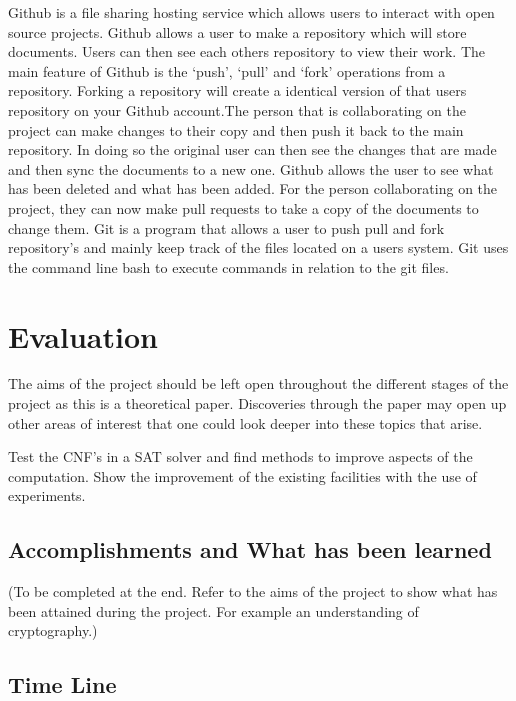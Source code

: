 \documentclass[11pt,a4paper, notitlepage]{report}
\begin{document}
Github is a file sharing hosting service which allows users to interact with open source projects. Github allows a user to make a repository which will store documents. Users can then see each others repository to view their work. The main feature of Github is the `push', `pull' and `fork' operations from a repository. Forking a repository will create a identical version of that users repository on your Github account.The person that is collaborating on the project can make changes to their copy and then push it back to the main repository. In doing so the original user can then see the changes that are made and then sync the documents to a new one. Github allows the user to see what has been deleted and what has been added. For the person collaborating on the project, they can now make pull requests to take a copy of the documents to change them.
Git is a program that allows a user to push pull and fork repository's and mainly keep track of the files located on a users system. Git uses the command line bash to execute commands in relation to the git files.















\chapter{Evaluation}
\label{cha:Eval}

The aims of the project should be left open throughout the different stages of the project as this is a theoretical paper. Discoveries through the paper may open up other areas of interest that one could look deeper into these topics that arise.


Test the CNF's in a SAT solver and find methods to improve aspects of the computation.
Show the improvement of the existing facilities with the use of experiments.
\section{Accomplishments and What has been learned}
\label{sec:Accomplishemnts}

(To be completed at the end. Refer to the aims of the project to show what has been attained during the project. For example an understanding of cryptography.)

\section{Time Line}
\label{sec:TimeLine}
\end{document}
